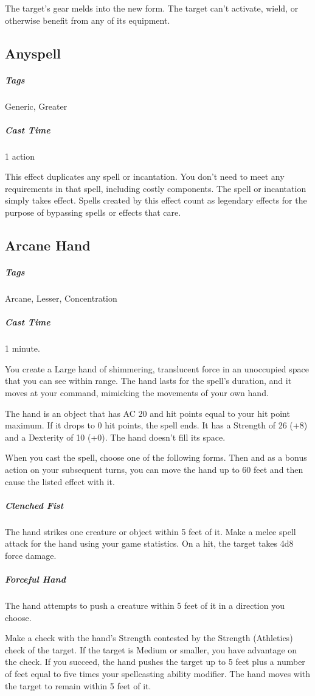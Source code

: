 The target’s gear melds into the new form. The target can’t activate, wield, or otherwise benefit from any of its equipment.

\subsection{Anyspell\label{spell:anyspell}}
\subparagraph*{Tags} Generic, Greater
\subparagraph*{Cast Time} 1 action

This effect duplicates any spell or incantation. You don’t need to meet any requirements in that spell, including costly components. The spell or incantation simply takes effect. Spells created by this effect count as legendary effects for the purpose of bypassing spells or effects that care.

\subsection{Arcane Hand\label{spell:arcane-hand}}
\subparagraph*{Tags} Arcane, Lesser, Concentration
\subparagraph*{Cast Time} 1 minute.

You create a Large hand of shimmering, translucent force in an unoccupied space that you can see within range. The hand lasts for the spell's duration, and it moves at your command, mimicking the movements of your own hand.

The hand is an object that has AC 20 and hit points equal to your hit point maximum. If it drops to 0 hit points, the spell ends. It has a Strength of 26 (+8) and a Dexterity of 10 (+0). The hand doesn't fill its space.

When you cast the spell, choose one of the following forms. Then and as a bonus action on your subsequent turns, you can move the hand up to 60 feet and then cause the listed effect with it.

\subparagraph*{Clenched Fist} The hand strikes one creature or object within 5 feet of it. Make a melee spell attack for the hand using your game statistics. On a hit, the target takes 4d8 force damage.

\subparagraph*{Forceful Hand} The hand attempts to push a creature within 5 feet of it in a direction you choose.

Make a check with the hand's Strength contested by the Strength (Athletics) check of the target. If the target is Medium or smaller, you have advantage on the check. If you succeed, the hand pushes the target up to 5 feet plus a number of feet equal to five times your spellcasting ability modifier. The hand moves with the target to remain within 5 feet of it.

